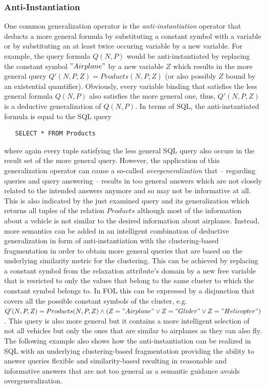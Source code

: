 \subsubsection{Anti-Instantiation}
One common generalization operator is the \emph{anti-instantiation} operator \citep{Wiese2014} that deducts a more general formula by substituting a
constant symbol with a variable or by substituting an at least twice occuring variable by a new variable. For example, the query formula $Q(N,P)$ would 
be anti-instantiated by replacing the constant symbol $"Airplane"$ by a new variable $Z$ which results in the more general query
$Q'(N,P,Z)=Products(N,P,Z)$ (or also possibly $Z$ bound by an existential quantifier). Obviously, every variable binding that satisfies the less general
formula $Q(N,P)$ also satisfies the more general one, thus, $Q'(N,P,Z)$ is a deductive generalization of $Q(N,P)$. In terms of SQL, the anti-instantiated
formula is equal to the SQL query 
\begin{verbatim}
   SELECT * FROM Products 
\end{verbatim}
where again every tuple satisfying the less general SQL query also occurs in the result set of the more general query. However, the application of this
generalization operator can cause a so-called \emph{overgeneralization} \citep{Wiese2014} that -- regarding queries and query answering -- results in 
too general answers which are not closely related to the intended answers anymore and so may not be informative at all. This is also indicated by the
just examined query and its generalization which returns all tuples of the relation $Products$ although most of the information about a vehicle is not
similar to the desired information about airplanes. Instead, more semantics can be added in an intelligent combination of deductive generalization in form
of anti-instantiation with the clustering-based fragmentation in order to obtain more general queries that are based on the underlying similarity metric
for the clustering. This can be achieved by replacing a constant symbol from the relaxation attribute's domain by a new free variable that is resricted to
only the values that belong to the same cluster to which the constant symbol belongs to. In FOL this can be expressed by a disjunction that covers all the
possible constant symbols of the cluster, e.g. $Q'(N,P,Z)=Products(N,P,Z) \land (Z="Airplane" \lor Z="Glider" \lor Z="Helicopter")$. This query is also
more general but it contains a more intelligent selection of not all vehicles but only the ones that are similar to airplanes as they can also fly. The
following example also shows how the anti-instantiation can be realized in SQL with an underlying clustering-based fragmentation providing the ability
to answer queries flexible and similarity-based resulting in reasonable and informative answers that are not too general as a semantic guidance 
\citep{Wiese2014} avoids overgeneralization.

